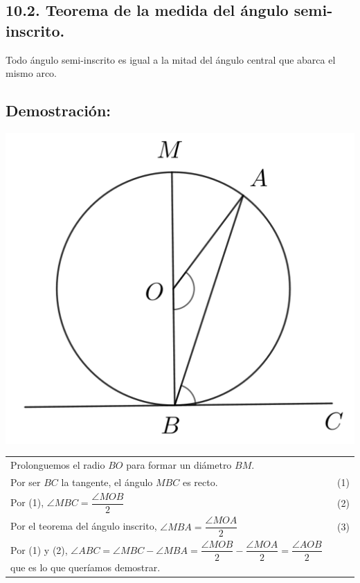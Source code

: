 \documentclass[12pt,a4paper]{article}
\begin{document}
\subsection*{10.2. Teorema de la medida del ángulo semi-inscrito.}
Todo ángulo semi-inscrito es igual a la mitad del ángulo central que abarca el mismo arco.
\subsection*{Demostración:}
\begin{center}
\includegraphics[scale=0.6]{Imagenes/circulo 3.png} 
\end{center}
\begin{tabular}{p{15.9 cm} p{1cm}}
Prolonguemos el radio  $BO$ para formar un diámetro $BM$. 
\\Por ser $BC$ la tangente, el ángulo $MBC$ es recto. &(1)
\\Por (1), $\angle MBC = \dfrac{\angle MOB}{2}$ &(2)
\\Por el teorema del ángulo inscrito, $\angle MBA = \dfrac{\angle MOA }{2}$&(3)
\\Por (1) y (2), $\angle ABC = \angle MBC - \angle MBA= \dfrac{\angle MOB}{2}-\dfrac{\angle MOA}{2}=\dfrac{\angle AOB}{2}$ que es lo que queríamos demostrar.
\end{tabular}
\end{document}
